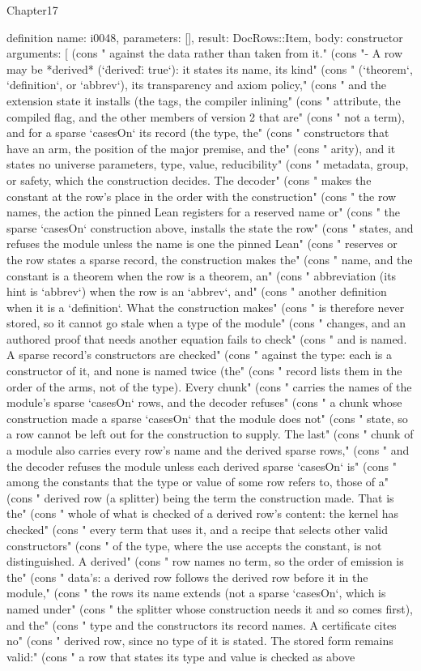 \begin{lexlean}{Chapter17}
\begin{semanticmodule}
definition{
  name: i0048,
  parameters: [],
  result: DocRows::Item,
  body: constructor{
    arguments: [
      (cons "  against the data rather than taken from it." (cons "- A row may be *derived* (`\"derived\": true`): it states its name, its kind" (cons "  (`theorem`, `definition`, or `abbrev`), its transparency and axiom policy," (cons "  and the extension state it installs (the tags, the compiler inlining" (cons "  attribute, the compiled flag, and the other members of version 2 that are" (cons "  not a term), and for a sparse `casesOn` its record (the type, the" (cons "  constructors that have an arm, the position of the major premise, and the" (cons "  arity), and it states no universe parameters, type, value, reducibility" (cons "  metadata, group, or safety, which the construction decides. The decoder" (cons "  makes the constant at the row's place in the order with the construction" (cons "  the row names, the action the pinned Lean registers for a reserved name or" (cons "  the sparse `casesOn` construction above, installs the state the row" (cons "  states, and refuses the module unless the name is one the pinned Lean" (cons "  reserves or the row states a sparse record, the construction makes the" (cons "  name, and the constant is a theorem when the row is a theorem, an" (cons "  abbreviation (its hint is `abbrev`) when the row is an `abbrev`, and" (cons "  another definition when it is a `definition`. What the construction makes" (cons "  is therefore never stored, so it cannot go stale when a type of the module" (cons "  changes, and an authored proof that needs another equation fails to check" (cons "  and is named. A sparse record's constructors are checked" (cons "  against the type: each is a constructor of it, and none is named twice (the" (cons "  record lists them in the order of the arms, not of the type). Every chunk" (cons "  carries the names of the module's sparse `casesOn` rows, and the decoder refuses" (cons "  a chunk whose construction made a sparse `casesOn` that the module does not" (cons "  state, so a row cannot be left out for the construction to supply. The last" (cons "  chunk of a module also carries every row's name and the derived sparse rows," (cons "  and the decoder refuses the module unless each derived sparse `casesOn` is" (cons "  among the constants that the type or value of some row refers to, those of a" (cons "  derived row (a splitter) being the term the construction made. That is the" (cons "  whole of what is checked of a derived row's content: the kernel has checked" (cons "  every term that uses it, and a recipe that selects other valid constructors" (cons "  of the type, where the use accepts the constant, is not distinguished. A derived" (cons "  row names no term, so the order of emission is the" (cons "  data's: a derived row follows the derived row before it in the module," (cons "  the rows its name extends (not a sparse `casesOn`, which is named under" (cons "  the splitter whose construction needs it and so comes first), and the" (cons "  type and the constructors its record names. A certificate cites no" (cons "  derived row, since no type of it is stated. The stored form remains valid:" (cons "  a row that states its type and value is checked as above }}
\end{semanticmodule}
\end{lexlean}
